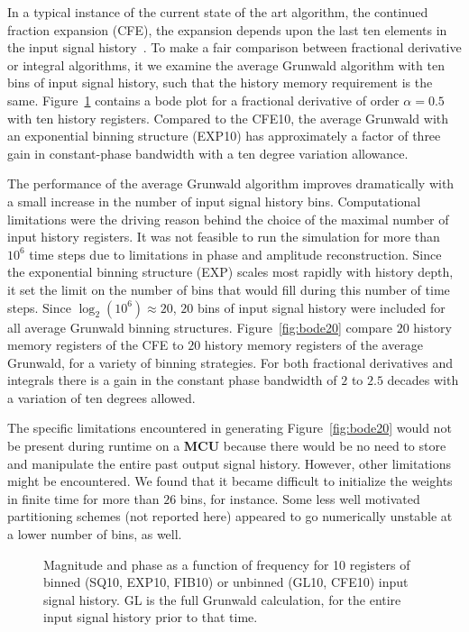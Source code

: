 In a typical instance of the current state of the art algorithm, the
continued fraction expansion (CFE), the expansion depends upon the
last ten elements in the input signal history~\cite{Chen:04a}. To make a
fair comparison between fractional derivative or integral algorithms,
it we examine the average Grunwald algorithm with ten bins of input
signal history, such that the history memory requirement is the
same. Figure~\ref{fig:bode10p05} contains a bode plot for a fractional
derivative of order $\alpha=0.5$ with ten history registers. Compared
to the CFE10, the average Grunwald with an exponential binning
structure (EXP10) has approximately a factor of three gain in
constant-phase bandwidth with a ten degree variation allowance. 

The performance of the average Grunwald algorithm improves
dramatically with a small increase in the number of input signal
history bins. Computational limitations were the driving reason behind the choice of the maximal number of input history registers. It was not feasible to run the simulation for more than $10^6$ time steps due to limitations in phase and amplitude reconstruction.  Since the exponential binning structure (EXP) scales most rapidly with history depth, it set the limit on the number of bins that would fill during this number of time steps. Since $\log_2(10^6)\approx 20$, $20$ bins of input signal history were included for all average Grunwald binning structures. Figure~\ref{fig:bode20} compare $20$
history memory registers of the CFE to $20$ history memory
registers of the average Grunwald, for a variety of binning
strategies. For both fractional
derivatives and integrals there is a gain in the constant phase
bandwidth of $2$ to $2.5$ decades with a variation of ten degrees allowed.

The specific limitations encountered in generating Figure~\ref{fig:bode20} would not be present during runtime on a {\bf  MCU} because there would be no need to store and manipulate the entire past output signal history. However, other limitations might be encountered. We found that it became difficult to initialize the weights in finite time for more than $26$ bins, for instance. Some less well motivated partitioning schemes (not reported here) appeared to go numerically unstable at a lower number of bins, as well. 

\begin{figure}
\label{fig:bode10p05}
\caption{Magnitude and phase as a function of frequency for 10
  registers of binned (SQ10, EXP10, FIB10) or unbinned (GL10, CFE10)
  input signal history. GL is the full Grunwald calculation, for the
  entire input signal history prior to that time.}
\end{figure}

